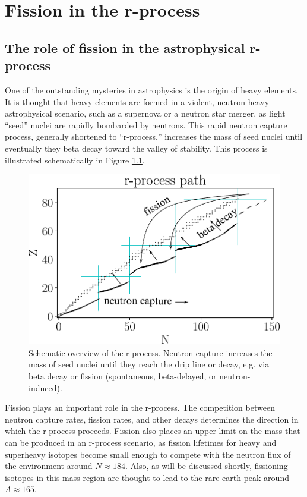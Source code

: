 \chapter{Fission in the r-process}\label{chap:rprocess}

\section{The role of fission in the astrophysical r-process}
One of the outstanding mysteries in astrophysics is the origin of heavy elements. It is thought that heavy elements are formed in a violent, neutron-heavy astrophysical scenario, such as a supernova or a neutron star merger, as light ``seed'' nuclei are rapidly bombarded by neutrons. This rapid neutron capture process, generally shortened to ``r-process,'' increases the mass of seed nuclei until eventually they beta decay toward the valley of stability.  This process is illustrated schematically in Figure \ref{fig:rprocpath}.

\begin{figure}
	\centering
	\includegraphics[width=0.8\linewidth]{TeX_files/rProc_path}
	\caption[Schematic overview of the r-process]{Schematic overview of the r-process. Neutron capture increases the mass of seed nuclei until they reach the drip line or decay, e.g. via beta decay or fission (spontaneous, beta-delayed, or neutron-induced).}
	\label{fig:rprocpath}
\end{figure}

Fission plays an important role in the r-process. The competition between neutron capture rates, fission rates, and other decays determines the direction in which the r-process proceeds. Fission also places an upper limit on the mass that can be produced in an r-process scenario, as fission lifetimes for heavy and superheavy isotopes become small enough to compete with the neutron flux of the environment around $N\approx184$. Also, as will be discussed shortly, fissioning isotopes in this mass region are thought to lead to the rare earth peak around $A\approx165$.

